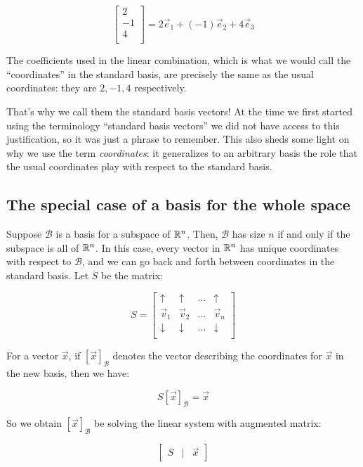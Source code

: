 \documentclass[10pt]{amsart}
\begin{document}
$$\left[\begin{matrix} 2 \\ -1 \\ 4 \\\end{matrix}\right] = 2\vec{e}_1 + (-1)\vec{e}_2 + 4\vec{e}_3$$

The coefficients used in the linear combination, which is what we
would call the ``coordinates'' in the standard basis, are precisely
the same as the usual coordinates: they are $2,-1,4$ respectively.

That's why we call them the standard basis vectors! At the time we
first started using the terminology ``standard basis vectors'' we did
not have access to this justification, so it was just a phrase to
remember. This also sheds some light on why we use the term {\em
  coordinates}: it generalizes to an arbitrary basis the role that
the usual coordinates play with respect to the standard basis.
\subsection{The special case of a basis for the whole space}

Suppose $\mathcal{B}$ is a basis for a subspace of $\mathbb{R}^n$. Then,
$\mathcal{B}$ has size $n$ if and only if the subspace is all of
$\mathbb{R}^n$. In this case, every vector in $\mathbb{R}^n$ has unique coordinates
with respect to $\mathcal{B}$, and we can go back and forth between
coordinates in the standard basis. Let $S$ be the matrix:

$$S = \left[\begin{matrix} \uparrow & \uparrow & \dots & \uparrow \\ \vec{v}_1 & \vec{v}_2 & \dots & \vec{v}_n \\ \downarrow & \downarrow & \dots & \downarrow \\\end{matrix}\right]$$

For a vector $\vec{x}$, if $[\vec{x}]_{\mathcal{B}}$ denotes the vector describing the
coordinates for $\vec{x}$ in the new basis, then we have:

$$S[\vec{x}]_{\mathcal{B}} = \vec{x}$$

So we obtain $[\vec{x}]_{\mathcal{B}}$ be solving the linear system with augmented
matrix:

$$\left[\begin{matrix} S & \mid & \vec{x} \end{matrix}\right]$$
\end{document}
